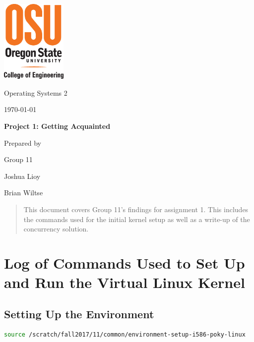 \documentclass[letterpaper, onecolumn, draftclsnofoot, 10pt, compsoc]{IEEEtran}
\def \GroupNumber{11}
\def \GroupMemberOne{Joshua Lioy}
\def \GroupMemberTwo{Brian Wiltse}
\begin{document}
\begin{titlepage}
    \begin{singlespace}
    	\includegraphics[height=4cm]{coe_v_spot1}
        \hfill 
        \par\vspace{.2in}
        \centering
        \scshape{
            \huge Operating Systems 2 \par
            {\large\today}\par
            \vspace{.5in}
            \textbf{\Huge Project 1: Getting Acquainted}\par
            \vfill
            \vspace{5pt}
            {\large Prepared by }\par
            Group \GroupNumber\par
            \vspace{5pt}
            {\Large
                \GroupMemberOne\par
                \GroupMemberTwo\par
            }
            \vspace{20pt}
        }
        \begin{abstract}
        This document covers Group 11's findings for assignment 1. This includes the commands used for the initial kernel setup as well as a write-up of the concurrency solution.
        \end{abstract}     
    \end{singlespace}
\end{titlepage}

\newpage
{}
\tableofcontents

\newpage
\section{Log of Commands Used to Set Up and Run the Virtual Linux Kernel}

    \subsection{Setting Up the Environment}
    \begin{lstlisting}[language=bash]
    source /scratch/fall2017/11/common/environment-setup-i586-poky-linux 
    \end{lstlisting}
    
\end{document}
